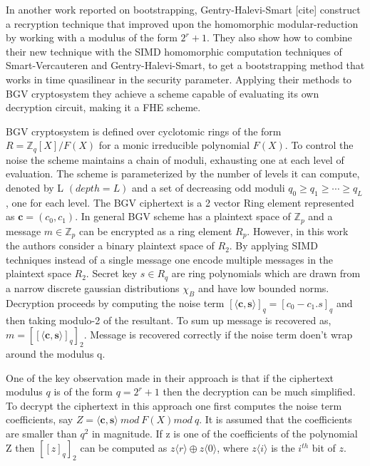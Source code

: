 \documentclass[10pt,journal,compsoc]{IEEEtran}
\theoremstyle{definition}
\begin{document}
In another work reported on bootstrapping, Gentry-Halevi-Smart [cite] construct a recryption technique that improved upon the homomorphic modular-reduction by working with a modulus of the form $2^r+1$. They also show how to combine their new technique with the SIMD homomorphic computation techniques
of Smart-Vercauteren and Gentry-Halevi-Smart, to get a bootstrapping method that works in time quasilinear in the security parameter. Applying their methods to BGV cryptosystem they achieve a scheme capable of evaluating its own decryption circuit, making it a FHE scheme. 

BGV cryptosystem is defined over cyclotomic rings of the form $R = \mathbb{Z}_q \left[ X \right]/F\left(X\right)$ for a monic irreducible polynomial $F\left(X\right)$. To control the noise the scheme maintains a chain of moduli, exhausting one at each level of evaluation. The scheme is parameterized by the number of levels it can compute, denoted by L $\left(depth = L\right)$ and  a set of decreasing odd moduli $q_0 \geq q_1 \geq \cdots \geq q_L$, one for each level. The BGV ciphertext is a 2 vector Ring element represented as $\textbf{c} = \left(c_0,c_1\right)$. In general BGV scheme has a plaintext space of $\mathbb{Z}_p$ and a message $m \in \mathbb{Z}_p$ can be encrypted as a ring element $R_p$. However, in this work the authors consider a binary plaintext space of $R_2$. By applying SIMD techniques instead of a single message one encode multiple messages in the plaintext space $R_2$. Secret key $s \in R_q$ are ring polynomials which are drawn from a narrow discrete gaussian distributions $\chi_B$ and have low bounded norms. Decryption proceeds by computing the noise term $\left[ \langle \textbf{c},\textbf{s}\rangle\right]_q = \left[ c_0 - c_1.s\right]_q$ and then taking modulo-2 of the resultant. To sum up message is recovered as, $m = \left[\left[ \langle \textbf{c},\textbf{s}\rangle\right]_q\right]_2$. Message is recovered correctly if the noise term doen't wrap around the modulus q.

One of the key observation made in their approach is that if the ciphertext modulus $q$ is of the form $q = 2^r + 1$ then the decryption can be much simplified. To decrypt the ciphertext in this approach one first computes the noise term coefficients, say $Z = \langle \textbf{c},\textbf{s}\rangle\ mod\ F\left(X\right) mod\ q$. It is assumed that the coefficients are smaller than $q^2$ in magnitude. If z is one of the coefficients of the polynomial Z then $\left[ \left[ z \right]_q\right]_2$ can be computed as $z\langle r\rangle \oplus z\langle 0\rangle $, where $z\langle i\rangle$ is the $i^{th}$ bit of $z$.
       
\end{document}
